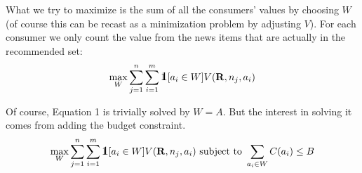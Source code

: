 \documentclass[10pt,a4paper]{article}
\def\one{\mbox{1\hspace{-4.25pt}\fontsize{12}{14.4}\selectfont\textrm{1}}} %
\begin{document}
What we try to maximize is the sum of all the consumers' values by choosing $W$ (of course this can be recast as a minimization problem by adjusting $V$). For each consumer we only count the value from the news items that are actually in the recommended set:\\
\begin{equation}
\max_W \sum_{j=1}^n \sum_{i=1}^m \one [a_i\in W] V(\mathbf{R}, n_j, a_i)
\end{equation}

Of course, Equation 1 is trivially solved by $W=A$. But the interest in solving it comes from adding the budget constraint.
\begin{equation}
\max_W \sum_{j=1}^n \sum_{i=1}^m \one [a_i\in W] V(\mathbf{R}, n_j, a_i) \text{ subject to } \sum_{a_i \in W} C(a_i) \leq B
\end{equation}
\end{document}
